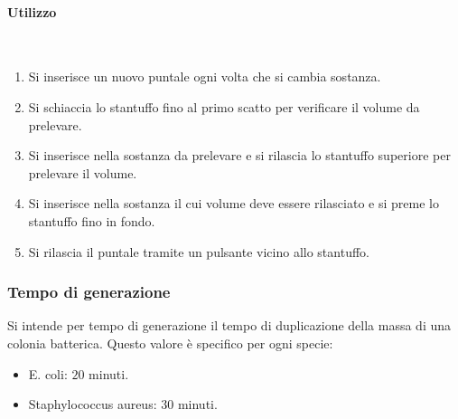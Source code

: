 			\paragraph{Utilizzo}\mbox{}\\
			\begin{multicols}{2}
				\begin{enumerate}
					\item Si inserisce un nuovo puntale ogni volta che si cambia sostanza.
					\item Si schiaccia lo stantuffo fino al primo scatto per verificare il volume da prelevare.
					\item Si inserisce nella sostanza da prelevare e si rilascia lo stantuffo superiore per prelevare il volume.
					\item Si inserisce nella sostanza il cui volume deve essere rilasciato e si preme lo stantuffo fino in fondo.
					\item Si rilascia il puntale tramite un pulsante vicino allo stantuffo.
				\end{enumerate}
			\end{multicols}

		\subsubsection{Tempo di generazione}
		Si intende per tempo di generazione il tempo di duplicazione della massa di una colonia batterica.
		Questo valore \`e specifico per ogni specie:
		\begin{multicols}{2}
			\begin{itemize}
				\item E. coli: $20$ minuti.
				\item Staphylococcus aureus: $30$ minuti.
			\end{itemize}
		\end{multicols}

